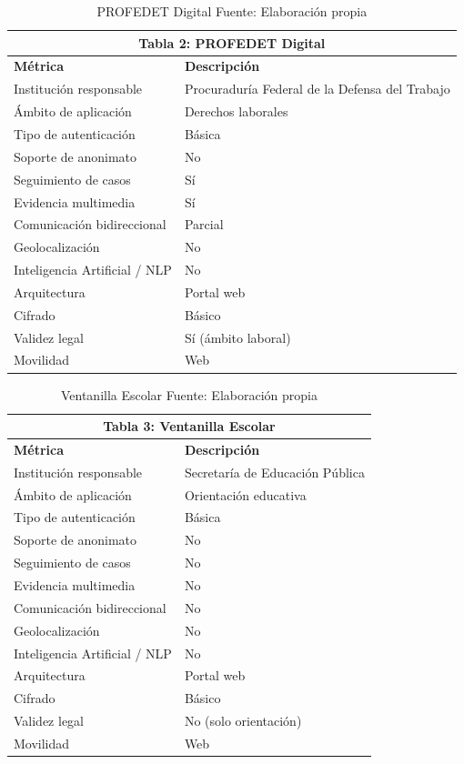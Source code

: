 \begin{table}[htbp]
\centering
\small
\begin{tabular}{|l|l|}
\hline \multicolumn{2}{|c|}{\textbf{Tabla 2: PROFEDET Digital}} \\
\hline \textbf{Métrica} & \textbf{Descripción} \\
\hline Institución responsable & Procuraduría Federal de la Defensa del Trabajo \\
\hline Ámbito de aplicación & Derechos laborales \\
\hline Tipo de autenticación & Básica \\
\hline Soporte de anonimato & No \\
\hline Seguimiento de casos & Sí \\
\hline Evidencia multimedia & Sí \\
\hline Comunicación bidireccional & Parcial \\
\hline Geolocalización & No \\
\hline Inteligencia Artificial / NLP & No \\
\hline Arquitectura & Portal web \\
\hline Cifrado & Básico \\
\hline Validez legal & Sí (ámbito laboral) \\
\hline Movilidad & Web \\
\hline \end{tabular}
\caption{PROFEDET Digital \footnotesize Fuente: Elaboración propia \cite{25} \label{tab:profedet}} 
\end{table}


\begin{table}[htbp]
\centering
\small
\begin{tabular}{|l|l|}
\hline \multicolumn{2}{|c|}{\textbf{Tabla 3: Ventanilla Escolar}} \\
\hline \textbf{Métrica} & \textbf{Descripción} \\
\hline Institución responsable & Secretaría de Educación Pública \\
\hline Ámbito de aplicación & Orientación educativa \\
\hline Tipo de autenticación & Básica \\
\hline Soporte de anonimato & No \\
\hline Seguimiento de casos & No \\
\hline Evidencia multimedia & No \\
\hline Comunicación bidireccional & No \\
\hline Geolocalización & No \\
\hline Inteligencia Artificial / NLP & No \\
\hline Arquitectura & Portal web \\
\hline Cifrado & Básico \\
\hline Validez legal & No (solo orientación) \\
\hline Movilidad & Web \\
\hline \end{tabular}
\caption{Ventanilla Escolar \footnotesize Fuente: Elaboración propia \cite{22} \label{tab:ventanilla}}
\end{table}




